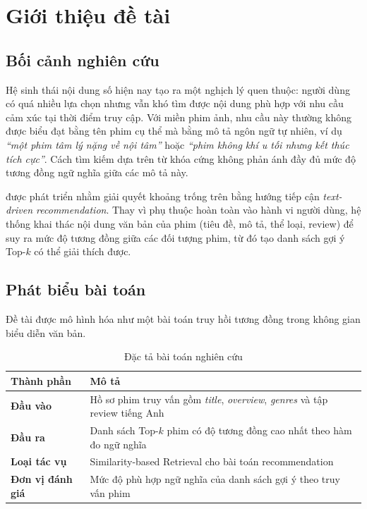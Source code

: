 \chapter{Giới thiệu đề tài}

\section{Bối cảnh nghiên cứu}
Hệ sinh thái nội dung số hiện nay tạo ra một nghịch lý quen thuộc: người dùng có quá nhiều lựa chọn nhưng vẫn khó tìm được nội dung phù hợp với nhu cầu cảm xúc tại thời điểm truy cập. Với miền phim ảnh, nhu cầu này thường không được biểu đạt bằng tên phim cụ thể mà bằng mô tả ngôn ngữ tự nhiên, ví dụ \textit{``một phim tâm lý nặng về nội tâm''} hoặc \textit{``phim không khí u tối nhưng kết thúc tích cực''}. Cách tìm kiếm dựa trên từ khóa cứng không phản ánh đầy đủ mức độ tương đồng ngữ nghĩa giữa các mô tả này.

\ProjectName{} được phát triển nhằm giải quyết khoảng trống trên bằng hướng tiếp cận \textit{text-driven recommendation}. Thay vì phụ thuộc hoàn toàn vào hành vi người dùng, hệ thống khai thác nội dung văn bản của phim (tiêu đề, mô tả, thể loại, review) để suy ra mức độ tương đồng giữa các đối tượng phim, từ đó tạo danh sách gợi ý Top-$k$ có thể giải thích được.

\section{Phát biểu bài toán}
Đề tài được mô hình hóa như một bài toán truy hồi tương đồng trong không gian biểu diễn văn bản.

\begin{table}[H]
\centering
\caption{Đặc tả bài toán nghiên cứu}
\begin{tabularx}{\textwidth}{>{\bfseries}p{3cm}X}
\toprule
Thành phần & Mô tả \\
\midrule
Đầu vào & Hồ sơ phim truy vấn gồm \textit{title}, \textit{overview}, \textit{genres} và tập review tiếng Anh \\
Đầu ra & Danh sách Top-$k$ phim có độ tương đồng cao nhất theo hàm đo ngữ nghĩa \\
Loại tác vụ & Similarity-based Retrieval cho bài toán recommendation \\
Đơn vị đánh giá & Mức độ phù hợp ngữ nghĩa của danh sách gợi ý theo truy vấn phim \\
\bottomrule
\end{tabularx}
\end{table}

